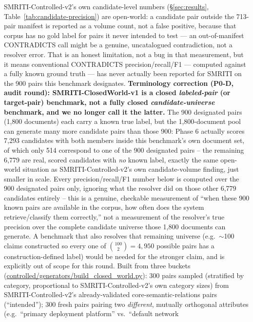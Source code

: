 

SMRITI-Controlled-v2's own candidate-level numbers
(\S\ref{sec:results}, Table~\ref{tab:candidate-precision}) are
open-world: a candidate pair outside the 713-pair manifest is reported
as a volume count, not a false positive, because that corpus has no
gold label for pairs it never intended to test --- an out-of-manifest
CONTRADICTS call might be a genuine, uncatalogued contradiction, not a
resolver error. That is an honest limitation, not a bug in that
measurement, but it means conventional CONTRADICTS
precision/recall/F1 --- computed against a fully known ground truth ---
has never actually been reported for SMRITI on the 900 pairs this
benchmark designates. \textbf{Terminology correction (P0-D, audit
round): SMRITI-ClosedWorld-v1 is a closed \emph{labeled-pair} (or
target-pair) benchmark, not a fully closed \emph{candidate-universe}
benchmark, and we no longer call it the latter.} The 900 designated
pairs (1{,}800 documents) each carry a known true label, but the
1{,}800-document pool can generate many more candidate pairs than those
900: Phase 6 actually scores 7{,}293 candidates with both members inside
this benchmark's own document set, of which only 514 correspond to one of
the 900 designated pairs -- the remaining 6{,}779 are real, scored
candidates with \emph{no} known label, exactly the same open-world
situation as SMRITI-Controlled-v2's own candidate-volume finding, just
smaller in scale. Every precision/recall/F1 number below is computed
over the 900 designated pairs only, ignoring what the resolver did on
those other 6{,}779 candidates entirely -- this is a genuine, checkable
measurement of ``when these 900 known pairs are available in the corpus,
how often does the system retrieve/classify them correctly,'' not a
measurement of the resolver's true precision over the complete candidate
universe those 1{,}800 documents can generate. A benchmark that also
resolves that remaining universe (e.g.\ $\sim$100 claims constructed so
every one of $\binom{100}{2}=4{,}950$ possible pairs has a
construction-defined label) would be needed for the stronger claim, and
is explicitly out of scope for this round. Built from three buckets
(\url{controlled/generators/build_closed_world.py}): 300
pairs sampled (stratified by category, proportional to
SMRITI-Controlled-v2's own category sizes) from SMRITI-Controlled-v2's
already-validated core-semantic-relations pairs (``intended''); 300
fresh pairs pairing two \emph{different}, mutually orthogonal attributes
(e.g.\ ``primary deployment platform'' vs.\ ``default network

